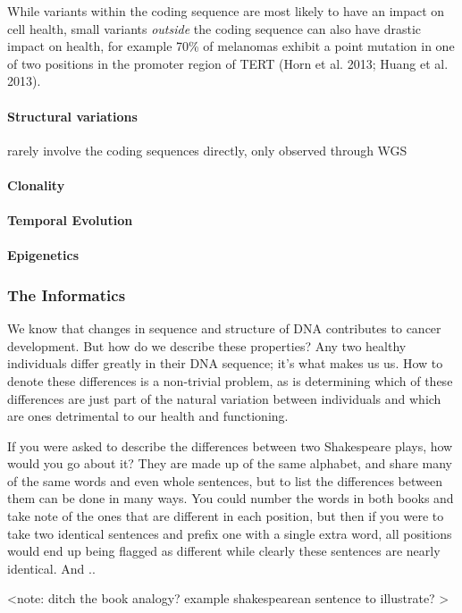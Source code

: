 While variants within the coding sequence are most likely to have an impact on cell health, small variants \emph{outside} the coding sequence can also have drastic impact on health, for example 70\% of melanomas exhibit a point mutation in one of two positions in the promoter region of TERT (Horn et al. 2013; Huang et al. 2013).

\paragraph{Structural variations}
rarely involve the coding sequences directly, only observed through WGS
\paragraph{Clonality}
\paragraph{Temporal Evolution}
\paragraph{Epigenetics}

\subsubsection{The Informatics}

We know that changes in sequence and structure of DNA contributes to cancer development. But how do we describe these properties? Any two healthy individuals differ greatly in their DNA sequence; it's what makes us us. How to denote these differences is a non-trivial problem, as is determining which of these differences are just part of the natural variation between individuals and which are ones detrimental to our health and functioning.

If you were asked to describe the differences between two Shakespeare plays, how would you go about it? They are made up of the same alphabet, and share many of the same words and even whole sentences, but to list the differences between them can be done in many ways. You could number the words in both books and take note of the ones that are different in each position, but then if you were to take two identical sentences and prefix one with a single extra word, all positions would end up being flagged as different while clearly these sentences are nearly identical. And ..

<note: ditch the book analogy? example shakespearean sentence to illustrate? >

